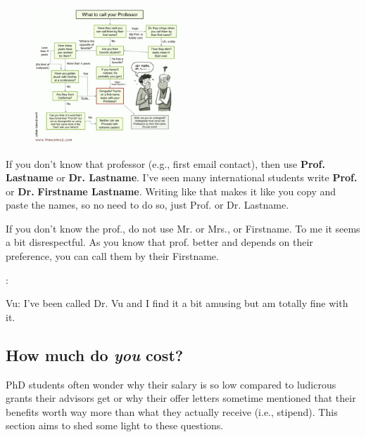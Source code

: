 \documentclass[11pt]{article}
\newenvironment{commentbox}[1][]{
\small
    \begin{cbox}
    \textbf{#1}: 
 }{
   \end{cbox}
}
\begin{document}
\begin{figure}
    \vspace{-0.4in}
      \begin{center}
        \includegraphics[width=0.5\textwidth]{c5.png}
      \end{center}
    \vspace{-0.9in}
    \end{figure}
If you don't know that professor (e.g., first email contact), then use \textbf{Prof. Lastname} or \textbf{Dr. Lastname}. I've seen many international students write \textbf{Prof.} or \textbf{Dr.} \textbf{Firstname Lastname}.  Writing like that makes it like you copy and paste the names, so no need to do so,  just Prof. or Dr. Lastname.
        
If you don't know the prof., do not use Mr. or Mrs., or Firstname. To me it seems a bit disrespectful. As you know that prof. better and depends on their preference, you can call them by their Firstname.


\begin{commentbox}
    Vu: I've been called Dr. Vu and I find it a bit amusing but am totally fine with it.
\end{commentbox}

\subsection{How much do \emph{you} cost?}\label{sec:ra-cost}
PhD students often wonder why their salary is so low compared to ludicrous grants their advisors get or why their offer letters sometime mentioned that their benefits worth way more than what they actually receive (i.e., stipend).  This section aims to shed some light to these questions.
\end{document}
